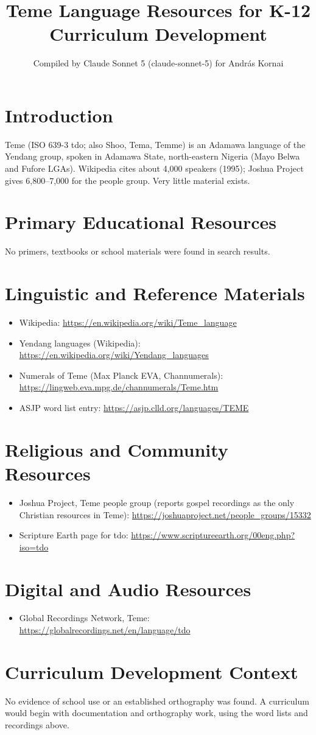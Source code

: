 \documentclass[12pt]{article}
\title{Teme Language Resources for K-12 Curriculum Development}
\author{Compiled by Claude Sonnet 5 (claude-sonnet-5) for Andr\'as Kornai}
\date{}
\begin{document}
\maketitle
\section{Introduction}
Teme (ISO 639-3 tdo; also Shoo, Tema, Temme) is an Adamawa language of the Yendang group, spoken in Adamawa State, north-eastern Nigeria (Mayo Belwa and Fufore LGAs). Wikipedia cites about 4,000 speakers (1995); Joshua Project gives 6,800--7,000 for the people group. Very little material exists.
\section{Primary Educational Resources}
No primers, textbooks or school materials were found in search results.
\section{Linguistic and Reference Materials}
\begin{itemize}
\item Wikipedia: \url{https://en.wikipedia.org/wiki/Teme_language}
\item Yendang languages (Wikipedia): \url{https://en.wikipedia.org/wiki/Yendang_languages}
\item Numerals of Teme (Max Planck EVA, Channumerals): \url{https://lingweb.eva.mpg.de/channumerals/Teme.htm}
\item ASJP word list entry: \url{https://asjp.clld.org/languages/TEME}
\end{itemize}
\section{Religious and Community Resources}
\begin{itemize}
\item Joshua Project, Teme people group (reports gospel recordings as the only Christian resources in Teme): \url{https://joshuaproject.net/people_groups/15332}
\item Scripture Earth page for tdo: \url{https://www.scriptureearth.org/00eng.php?iso=tdo}
\end{itemize}
\section{Digital and Audio Resources}
\begin{itemize}
\item Global Recordings Network, Teme: \url{https://globalrecordings.net/en/language/tdo}
\end{itemize}
\section{Curriculum Development Context}
No evidence of school use or an established orthography was found. A curriculum would begin with documentation and orthography work, using the word lists and recordings above.
\end{document}
